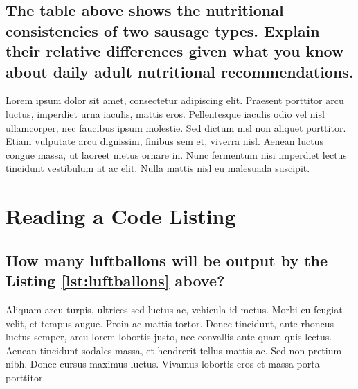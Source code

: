 \documentclass[11pt]{scrartcl} %
\begin{document}

\subsection{The table above shows the nutritional consistencies of two sausage types. Explain their relative differences given what you know about daily adult nutritional recommendations.}

Lorem ipsum dolor sit amet, consectetur adipiscing elit. Praesent porttitor arcu luctus, imperdiet urna iaculis, mattis eros. Pellentesque iaculis odio vel nisl ullamcorper, nec faucibus ipsum molestie. Sed dictum nisl non aliquet porttitor. Etiam vulputate arcu dignissim, finibus sem et, viverra nisl. Aenean luctus congue massa, ut laoreet metus ornare in. Nunc fermentum nisi imperdiet lectus tincidunt vestibulum at ac elit. Nulla mattis nisl eu malesuada suscipit.


\section{Reading a Code Listing}




\subsection{How many luftballons will be output by the Listing \ref{lst:luftballons} above?}

Aliquam arcu turpis, ultrices sed luctus ac, vehicula id metus. Morbi eu feugiat velit, et tempus augue. Proin ac mattis tortor. Donec tincidunt, ante rhoncus luctus semper, arcu lorem lobortis justo, nec convallis ante quam quis lectus. Aenean tincidunt sodales massa, et hendrerit tellus mattis ac. Sed non pretium nibh. Donec cursus maximus luctus. Vivamus lobortis eros et massa porta porttitor.
\end{document}
